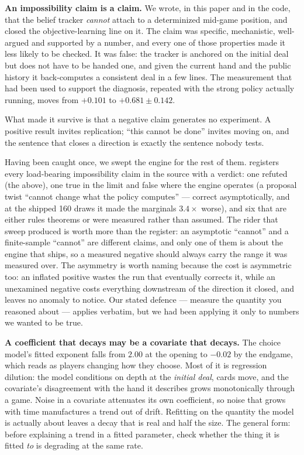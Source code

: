 \documentclass[11pt,a4paper]{article}
\begin{document}
\textbf{An impossibility claim is a claim.} We wrote, in this paper and in the
code, that the belief tracker \emph{cannot} attach to a determinized mid-game
position, and closed the objective-learning line on it. The claim was specific,
mechanistic, well-argued and supported by a number, and every one of those
properties made it less likely to be checked. It was false: the tracker is
anchored on the initial deal but does not have to be handed one, and given the
current hand and the public history it back-computes a consistent deal in a few
lines. The measurement that had been used to support the diagnosis, repeated
with the strong policy actually running, moves from $+0.101$ to
$+0.681 \pm 0.142$.

What made it survive is that a negative claim generates no experiment. A positive
result invites replication; ``this cannot be done'' invites moving on, and the
sentence that closes a direction is exactly the sentence nobody tests.

Having been caught once, we swept the engine for the rest of them.
 registers every load-bearing impossibility
claim in the source with a verdict: one refuted (the above), one true in the
limit and false where the engine operates (a proposal twist ``cannot change what
the policy computes'' --- correct asymptotically, and at the shipped 160 draws it
made the marginals $3.4\times$ worse), and six that are either rules theorems or
were measured rather than assumed. The rider that sweep produced is worth more
than the register: an asymptotic ``cannot'' and a finite-sample ``cannot'' are
different claims, and only one of them is about the engine that ships, so a
measured negative should always carry the range it was measured over. The
asymmetry is worth naming because the cost is asymmetric too: an inflated
positive wastes the run that eventually corrects it, while an unexamined negative
costs everything downstream of the direction it closed, and leaves no anomaly to
notice. Our stated defence --- measure the quantity you reasoned about --- applies
verbatim, but we had been applying it only to numbers we wanted to be true.

\textbf{A coefficient that decays may be a covariate that decays.} The choice
model's fitted exponent falls from $2.00$ at the opening to $-0.02$ by the
endgame, which reads as players changing how they choose. Most of it is
regression dilution: the model conditions on depth at the \emph{initial deal},
cards move, and the covariate's disagreement with the hand it describes grows
monotonically through a game. Noise in a covariate attenuates its own
coefficient, so noise that grows with time manufactures a trend out of drift.
Refitting on the quantity the model is actually about leaves a decay that is real
and half the size. The general form: before explaining a trend in a fitted
parameter, check whether the thing it is fitted \emph{to} is degrading at the
same rate.
\end{document}
